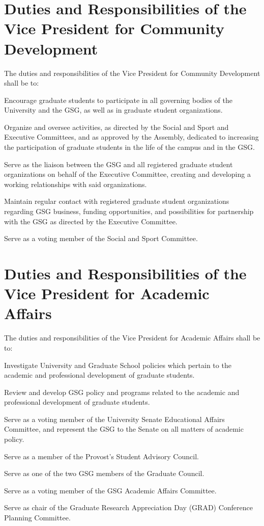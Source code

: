 \section{Duties and Responsibilities of the Vice President for Community Development}
The duties and responsibilities of the Vice President for Community Development shall be to:
\begin{bylaws-number}
  \item Encourage graduate students to participate in all governing bodies of the University and the GSG, as well as in graduate student organizations.
  \item Organize and oversee activities, as directed by the Social and Sport and Executive Committees, and as approved by the Assembly, dedicated to increasing the participation of graduate students in the life of the campus and in the GSG.
  \item Serve as the liaison between the GSG and all registered graduate student organizations on behalf of the Executive Committee, creating and developing a working relationships with said organizations.
  \item Maintain regular contact with registered graduate student organizations regarding GSG business, funding opportunities, and possibilities for partnership with the GSG as directed by the Executive Committee.
  \item Serve as a voting member of the Social and Sport Committee.
\end{bylaws-number}

\section{Duties and Responsibilities of the Vice President for Academic Affairs}
The duties and responsibilities of the Vice President for Academic Affairs shall be to:
\begin{bylaws-number}
  \item Investigate University and Graduate School policies which pertain to the academic and professional development of graduate students.
  \item Review and develop GSG policy and programs related to the academic and professional development of graduate students.
  \item Serve as a voting member of the University Senate Educational Affairs Committee, and represent the GSG to the Senate on all matters of academic policy.
  \item Serve as a member of the Provost’s Student Advisory Council.
  \item Serve as one of the two GSG members of the Graduate Council.
  \item Serve as a voting member of the GSG Academic Affairs Committee.
\item Serve as chair of the Graduate Research Appreciation Day (GRAD) Conference Planning Committee.
\end{bylaws-number}

